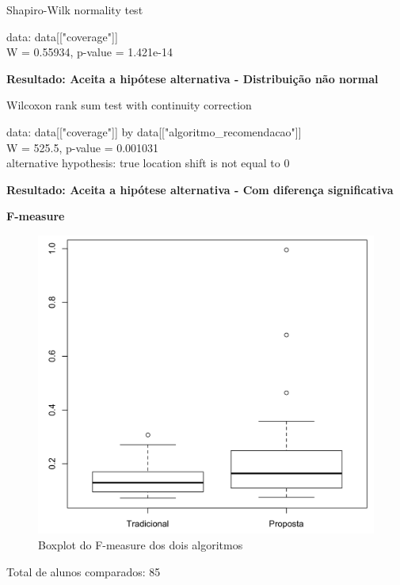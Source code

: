     Shapiro-Wilk normality test

\noindent
data:  data[["coverage"]]\\
W = 0.55934, p-value = 1.421e-14

\textbf{Resultado: Aceita a hipótese alternativa - Distribuição não normal}

  Wilcoxon rank sum test with continuity correction

\noindent
data:  data[["coverage"]] by data[["algoritmo\_recomendacao"]]\\
W = 525.5, p-value = 0.001031\\
alternative hypothesis: true location shift is not equal to 0

\textbf{Resultado: Aceita a hipótese alternativa - Com diferença significativa}

\textbf{F-measure}

\begin{figure}[htb]
  \caption{\label{fig:media-harmonica-boxplot}Boxplot do F-measure dos dois algoritmos}
  \begin{center}
      \includegraphics[scale=0.4]{./Figuras/media-harmonica-boxplot.png}
  \end{center}
\end{figure}

Total de alunos comparados: 85

